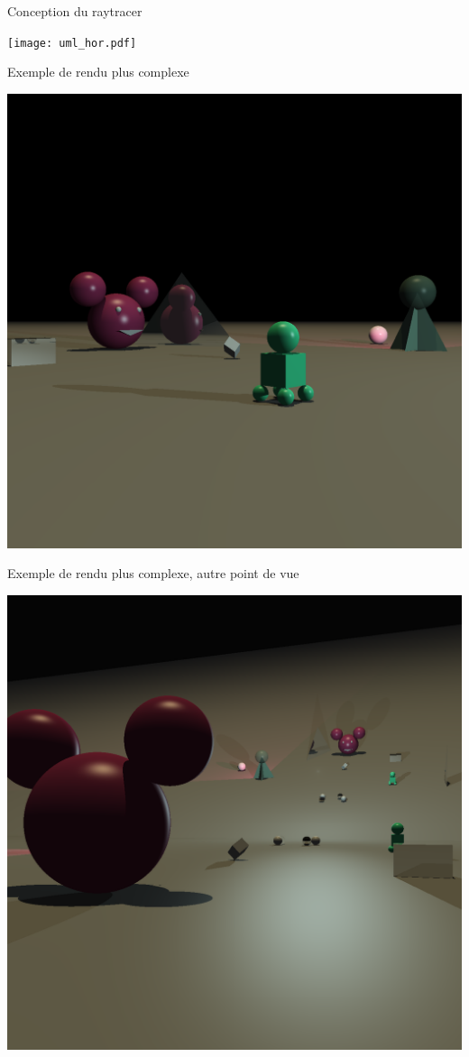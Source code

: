 \documentclass{beamer}
\begin{document}
  \begin{frame}{Conception du raytracer}
      \centerline{\texttt{[image: uml\_hor.pdf]}}
  \end{frame}

  \begin{frame}{Exemple de rendu plus complexe}
    \centerline{
      \includegraphics[width=\textwidth, height=0.8\paperheight,
      keepaspectratio=true]{0377.png}
    }
  \end{frame}

  \begin{frame}{Exemple de rendu plus complexe, autre point de vue}
    \centerline{
      \includegraphics[width=\textwidth, height=0.8\paperheight,
      keepaspectratio=true]{0699.png}
    }
  \end{frame}
\end{document}
